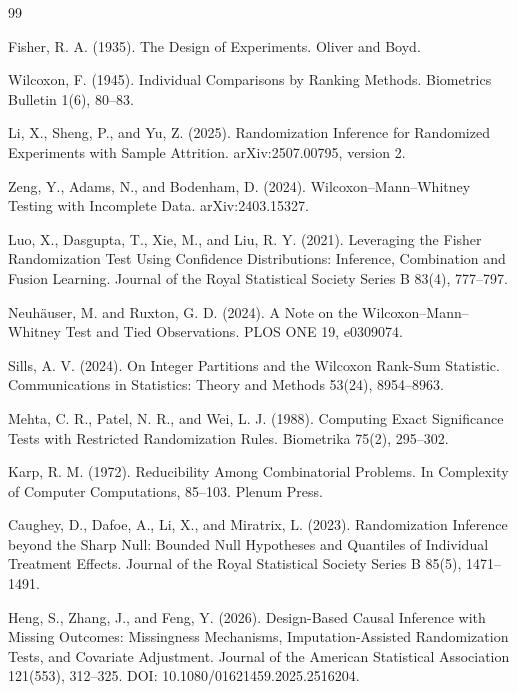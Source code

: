\documentclass{article}
\begin{document}
\begin{thebibliography}{99}

   Fisher, R. A. (1935). The Design of Experiments. Oliver and Boyd.

   Wilcoxon, F. (1945). Individual Comparisons by Ranking Methods. Biometrics Bulletin 1(6), 80--83.

   Li, X., Sheng, P., and Yu, Z. (2025). Randomization Inference for Randomized Experiments with Sample Attrition. arXiv:2507.00795, version 2.

   Zeng, Y., Adams, N., and Bodenham, D. (2024). Wilcoxon--Mann--Whitney Testing with Incomplete Data. arXiv:2403.15327.

   Luo, X., Dasgupta, T., Xie, M., and Liu, R. Y. (2021). Leveraging the Fisher Randomization Test Using Confidence Distributions: Inference, Combination and Fusion Learning. Journal of the Royal Statistical Society Series B 83(4), 777--797.

   Neuhäuser, M. and Ruxton, G. D. (2024). A Note on the Wilcoxon--Mann--Whitney Test and Tied Observations. PLOS ONE 19, e0309074.

   Sills, A. V. (2024). On Integer Partitions and the Wilcoxon Rank-Sum Statistic. Communications in Statistics: Theory and Methods 53(24), 8954--8963.

   Mehta, C. R., Patel, N. R., and Wei, L. J. (1988). Computing Exact Significance Tests with Restricted Randomization Rules. Biometrika 75(2), 295--302.

   Karp, R. M. (1972). Reducibility Among Combinatorial Problems. In Complexity of Computer Computations, 85--103. Plenum Press.

   Caughey, D., Dafoe, A., Li, X., and Miratrix, L. (2023). Randomization Inference beyond the Sharp Null: Bounded Null Hypotheses and Quantiles of Individual Treatment Effects. Journal of the Royal Statistical Society Series B 85(5), 1471--1491.

   Heng, S., Zhang, J., and Feng, Y. (2026). Design-Based Causal Inference with Missing Outcomes: Missingness Mechanisms, Imputation-Assisted Randomization Tests, and Covariate Adjustment. Journal of the American Statistical Association 121(553), 312--325. DOI: 10.1080/01621459.2025.2516204.


\end{thebibliography}
\end{document}
